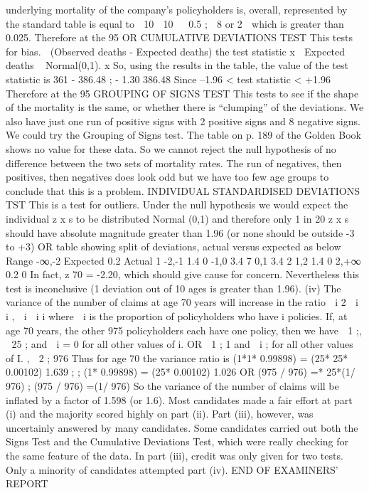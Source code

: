 underlying mortality of the company’s policyholders is, overall, represented
by the standard table is equal to
 10  10

 0.5 ;\+
 8 or 2 
which is greater than 0.025.
Therefore at the 95%
OR CUMULATIVE DEVIATIONS TEST
This tests for bias.
 (Observed deaths - Expected deaths)
the test statistic
x
 Expected deaths
~ Normal(0,1).
x
So, using the results in the table, the value of the test statistic is
361 - 386.48
;\+\; - 1.30
386.48
Since –1.96 < test statistic < +1.96
Therefore at the 95%
GROUPING OF SIGNS TEST
This tests to see if the shape of the mortality is the same, or whether there is
“clumping” of the deviations.
We also have just one run of positive signs with 2 positive signs and 8
negative signs.
We could try the Grouping of Signs test. The table on p. 189 of the Golden
Book shows no value for these data. So we cannot reject the null hypothesis
of no difference between the two sets of mortality rates.
The run of negatives, then positives, then negatives does look odd but we have
too few age groups to conclude that this is a problem.
INDIVIDUAL STANDARDISED DEVIATIONS TST
This is a test for outliers.
Under the null hypothesis we would expect the individual z x s to be distributed
Normal (0,1)
and therefore only 1 in 20 z x s should have absolute magnitude greater than
1.96 (or none should be outside -3 to +3)
OR
table showing split of deviations, actual versus expected as below
Range
-∞,-2
Expected 0.2
Actual
1
-2,-1
1.4
0
-1,0
3.4
7
0,1
3.4
2
1,2
1.4
0
2,+∞
0.2
0
In fact, z 70 = -2.20, which should give cause for concern.
Nevertheless this test is inconclusive (1 deviation out of 10 ages is greater than
1.96).
(iv)
The variance of the number of claims at age 70 years will increase in the ratio
 i 2  i
i
,
 i  i
i
where  i is the proportion of policyholders who have i policies.
If, at age 70 years, the other 975 policyholders each have one policy, then we
have
 1 ;\+,  25 ;\+ and  i = 0 for all other values of i.
OR
 1 ;\+
1
and  i ;\+ for all other values of I.
,  2 ;\+
976
Thus for age 70 the variance ratio is
(1*1* 0.99898) \;=\; (25* 25* 0.00102) 1.639
;\+\;
;\+
(1* 0.99898) \;=\; (25* 0.00102)
1.026
OR
(975 / 976) \;=* 25*(1/ 976)
;\+
(975 / 976) \;=(1/ 976)
So the variance of the number of claims will be inflated by a factor of 1.598
(or 1.6).
Most candidates made a fair effort at part (i) and the majority scored highly on
part (ii). Part (iii), however, was uncertainly answered by many candidates.
Some candidates carried out both the Signs Test and the Cumulative
Deviations Test, which were really checking for the same feature of the data.
In part (iii), credit was only given for two tests. Only a minority of candidates
attempted part (iv).
END OF EXAMINERS’ REPORT
